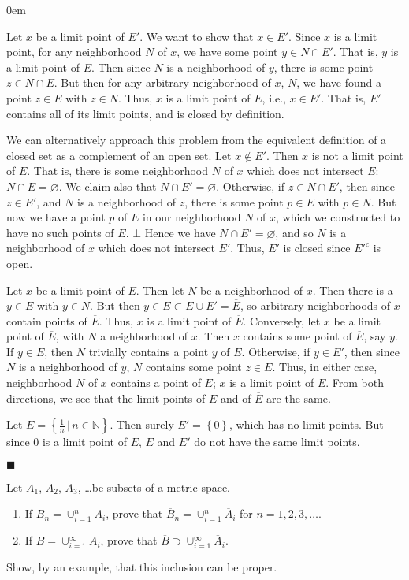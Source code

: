 \documentclass[12pt]{article}
\renewcommand{\qed}{\hfill$\blacksquare$}
\renewenvironment{proof}{\begin{addmargin}[1em]{0em}\begin{newproof}}{\end{newproof}\end{addmargin}\qed}
\newenvironment{problem}[2][Exercise]{\begin{trivlist}
\item[\hskip \labelsep {\bfseries #1}\hskip \labelsep {\bfseries #2.}]}{\end{trivlist}}
\begin{document}
\begin{proof}
Let $x$ be a limit point of $E'$. We want to show that $x \in E'$. Since $x$ is a limit point, for any neighborhood $N$ of $x$, we have some point $y \in N\cap E'$. That is, $y$ is a limit point of $E$. Then since $N$ is a neighborhood of $y$, there is some point $z \in N\cap E$. But then for any arbitrary neighborhood of $x$, $N$, we have found a point $z \in E$ with $z \in N$. Thus, $x$ is a limit point of $E$, i.e., $x\in E'$. That is, $E'$ contains all of its limit points, and is closed by definition.

{\color{red} We can alternatively approach this problem from the equivalent definition of a closed set as a complement of an open set. Let $x\notin E'$. Then $x$ is not a limit point of $E$. That is, there is some neighborhood $N$ of $x$ which does not intersect $E$: $N\cap E = \varnothing$. We claim also that $N\cap E' = \varnothing$. Otherwise, if $z \in N \cap E'$, then since $z \in E'$, and $N$ is a neighborhood of $z$, there is some point $p \in E$ with $p \in N$. But now we have a point $p$ of $E$ in our neighborhood $N$ of $x$, which we constructed to have no such points of $E$. $\bot$ Hence we have $N\cap E' = \varnothing$, and so $N$ is a neighborhood of $x$ which does not intersect $E'$. Thus, $E'$ is closed since $E'^c$ is open.}

Let $x$ be a limit point of $E$. Then let $N$ be a neighborhood of $x$. Then there is a $y\in E$ with $y\in N$. But then $y \in E \subset E\cup E' = \overline{E}$, so arbitrary neighborhoods of $x$ contain points of $\overline{E}$. Thus, $x$ is a limit point of $\overline{E}$. Conversely, let $x$ be a limit point of $\overline{E}$, with $N$ a neighborhood of $x$. Then $x$ contains some point of $\overline{E}$, say $y$. If $y\in E$, then $N$ trivially contains a point $y$ of $E$. Otherwise, if $y \in E'$, then since $N$ is a neighborhood of $y$, $N$ contains some point $z \in E$. Thus, in either case, neighborhood $N$ of $x$ contains a point of $E$; $x$ is a limit point of $E$. From both directions, we see that the limit points of $E$ and of $\overline{E}$ are the same.

Let $E = \left\{ \frac{1}{n} \, | \, n\in \mathbb{N} \right\}$. Then surely $E' = \left\{0\right\}$, which has no limit points. But since $0$ is a limit point of $E$, $E$ and $E'$ do not have the same limit points.
\end{proof}



\begin{problem}{2.7}
Let $A_1$, $A_2$, $A_3$, \ldots be subsets of a metric space.
\begin{enumerate}[label=(\alph*)]
	\item If $B_n = \cup_{i=1}^n A_i$, prove that $\overline{B}_n = \cup_{i=1}^n \overline{A}_i$ for $n=1,2,3,\ldots$.
	\item If $B = \cup_{i=1}^{\infty} A_i$, prove that $\overline{B} \supset \cup_{i=1}^{\infty} \overline{A}_i$.
\end{enumerate}
Show, by an example, that this inclusion can be proper.
\end{problem}
\end{document}
